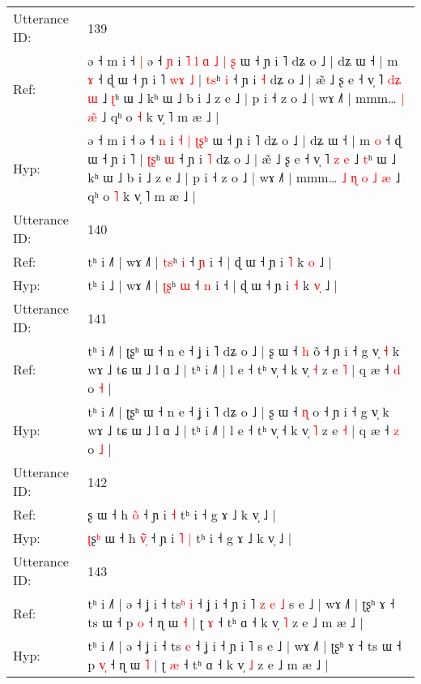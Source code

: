 \documentclass[10pt]{article}
\DeclareRobustCommand{\hl}[1]{{\textcolor{red}{#1}}}
\begin{document}
\begin{longtable}{ll}
\midrule
Utterance ID: & 139 \\
Ref: & ə ˧ m i ˧\hl{ }\hl{|} ə ˧ \hl{ɲ} i\hl{ }\hl{˥}\hl{ }\hl{l} \hl{ɑ} \hl{˩} \hl{|}\hl{ }\hl{ʂ} ɯ ˧ ɲ i ˥ dʑ o ˩ | dʑ ɯ ˧ | m \hl{ɤ} ˧ ɖ ɯ ˧ ɲ i ˥\hl{ }\hl{w}\hl{ɤ}\hl{ }\hl{˩} | \hl{t}\hl{s}ʰ \hl{i} ˧ ɲ i \hl{˧} dʑ o ˩ | æ̃ ˩ ʂ e ˧ v̩ ˥ \hl{d}\hl{ʑ} \hl{ɯ} ˩ \hl{ʈ}ʰ ɯ ˩ kʰ ɯ ˩ b i ˩ z e ˩ | p i ˧ z o ˩ | wɤ ˩˥ | mmm…\hl{}\hl{}\hl{}\hl{} \hl{|} \hl{}\hl{æ}\hl{̃} ˩ qʰ o \hl{˧} k v̩ ˥ m æ ˩ |
 \\
Hyp: & ə ˧ m i ˧\hl{}\hl{} ə ˧ \hl{n} i\hl{}\hl{}\hl{}\hl{} \hl{˧} \hl{|} \hl{ʈ}\hl{ʂ}\hl{ʰ} ɯ ˧ ɲ i ˥ dʑ o ˩ | dʑ ɯ ˧ | m \hl{o} ˧ ɖ ɯ ˧ ɲ i ˥\hl{}\hl{}\hl{}\hl{}\hl{} | \hl{ʈ}\hl{ʂ}ʰ \hl{ɯ} ˧ ɲ i \hl{˥} dʑ o ˩ | æ̃ ˩ ʂ e ˧ v̩ ˥ \hl{}\hl{z} \hl{e} ˩ \hl{t}ʰ ɯ ˩ kʰ ɯ ˩ b i ˩ z e ˩ | p i ˧ z o ˩ | wɤ ˩˥ | mmm…\hl{ }\hl{˩}\hl{ }\hl{ɳ} \hl{o} \hl{˩}\hl{ }\hl{æ} ˩ qʰ o \hl{˥} k v̩ ˥ m æ ˩ |
 \\
\midrule
Utterance ID: & 140 \\
Ref: & tʰ i ˩\hl{˥} | wɤ ˩˥ | \hl{t}\hl{s}ʰ \hl{i} ˧ \hl{ɲ} i ˧ | ɖ ɯ ˧ ɲ i \hl{˥} k \hl{}\hl{o} ˩ |
 \\
Hyp: & tʰ i ˩\hl{} | wɤ ˩˥ | \hl{ʈ}\hl{ʂ}ʰ \hl{ɯ} ˧ \hl{n} i ˧ | ɖ ɯ ˧ ɲ i \hl{˧} k \hl{v}\hl{̩} ˩ |
 \\
\midrule
Utterance ID: & 141 \\
Ref: & tʰ i ˩˥ | ʈʂʰ ɯ ˧ n e ˧ ʝ i ˥ dʑ o ˩ | ʂ ɯ ˧ \hl{h} o\hl{̃} ˧ ɲ i ˧ g v̩\hl{ }\hl{˧} k wɤ ˩ tɕ ɯ ˩ l ɑ ˩ | tʰ i ˩˥ | l e ˧ tʰ v̩ ˧ k v̩ \hl{˧} z e \hl{˥} | q æ ˧ \hl{d} o \hl{˧} |
 \\
Hyp: & tʰ i ˩˥ | ʈʂʰ ɯ ˧ n e ˧ ʝ i ˥ dʑ o ˩ | ʂ ɯ ˧ \hl{ɳ} o\hl{} ˧ ɲ i ˧ g v̩\hl{}\hl{} k wɤ ˩ tɕ ɯ ˩ l ɑ ˩ | tʰ i ˩˥ | l e ˧ tʰ v̩ ˧ k v̩ \hl{˥} z e \hl{˧} | q æ ˧ \hl{z} o \hl{˩} |
 \\
\midrule
Utterance ID: & 142 \\
Ref: & \hl{}ʂ\hl{} ɯ ˧ h \hl{o}̃\hl{} ˧ ɲ i\hl{}\hl{} \hl{˧} tʰ i ˧ g ɤ ˩ k v̩ ˩ |
 \\
Hyp: & \hl{ʈ}ʂ\hl{ʰ} ɯ ˧ h \hl{v}̃\hl{̩} ˧ ɲ i\hl{ }\hl{˥} \hl{|} tʰ i ˧ g ɤ ˩ k v̩ ˩ |
 \\
\midrule
Utterance ID: & 143 \\
Ref: & tʰ i ˩˥ | ə ˧ ʝ i ˧ ts\hl{ʰ} \hl{i} ˧ ʝ i ˧ ɲ i ˥\hl{ }\hl{z}\hl{ }\hl{e}\hl{ }\hl{˩} s e ˩ | wɤ ˩˥ | ʈʂʰ ɤ ˧ ts ɯ ˧ p \hl{}\hl{o} ˧ ɳ ɯ \hl{˧} | ʈ \hl{ɤ} ˧ tʰ ɑ ˧ k v̩ \hl{˥} z e ˩ m æ ˩ |
 \\
Hyp: & tʰ i ˩˥ | ə ˧ ʝ i ˧ ts\hl{} \hl{e} ˧ ʝ i ˧ ɲ i ˥\hl{}\hl{}\hl{}\hl{}\hl{}\hl{} s e ˩ | wɤ ˩˥ | ʈʂʰ ɤ ˧ ts ɯ ˧ p \hl{v}\hl{̩} ˧ ɳ ɯ \hl{˥} | ʈ \hl{æ} ˧ tʰ ɑ ˧ k v̩ \hl{˩} z e ˩ m æ ˩ |

\end{longtable}
\end{document}
